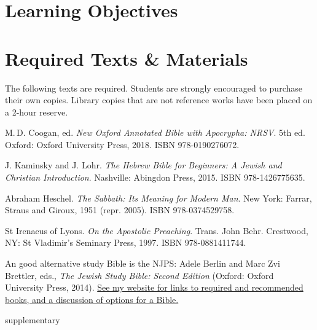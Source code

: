 \documentclass[titlepage]{article}
\newcommand\incl{../includes}
\begin{document}


  \section{Learning Objectives}
  \label{objectives}

  \edobject

\section{Required Texts \& Materials}
\label{texts}

The following texts are required. Students are strongly encouraged to
purchase their own copies. Library copies that are not reference works
have been placed on a 2-hour reserve.

\begingroup
\renewcommand{\section}[2]{}%
\begin{thebibliography}{Irenaeus}%

	 M.\,D. Coogan, ed.
    \emph{New Oxford Annotated Bible with Apocrypha: NRSV}. 5th ed.
    Oxford: Oxford University Press, 2018.
    ISBN 978-0190276072.

	 J. Kaminsky and J. Lohr.
	\emph{The Hebrew Bible for Beginners: A Jewish and Christian Introduction}.
	Nashville: Abingdon Press, 2015.
	ISBN 978-1426775635.

	 Abraham Heschel.
	\emph{The Sabbath: Its Meaning for Modern Man}.
	New York: Farrar, Straus and Giroux, 1951 (repr. 2005).
	ISBN 978-0374529758.

	 St Irenaeus of Lyons.
	\emph{On the Apostolic Preaching}.
	Trans. John Behr.
	Crestwood, NY: St Vladimir’s Seminary Press, 1997.
	ISBN 978-0881411744.

\end{thebibliography}
\endgroup

An good alternative study Bible is the NJPS: Adele Berlin and Marc Zvi
Brettler, eds., \emph{The Jewish Study Bible: Second Edition} (Oxford:
Oxford University Press, 2014). \href{https://danieldriver.com/courses/bf-1001/}{See
my website for links to required and recommended books, and a discussion
of options for a Bible.}

\section{Supplementary Texts}
\label{supplementary}
\end{document}
